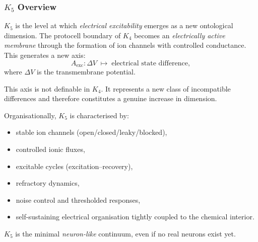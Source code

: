 

\subsubsection{\texorpdfstring{$K_5$}{K_5} Overview}
\label{sec:k5-overview}

$K_5$ is the level at which \emph{electrical excitability} emerges as a
new ontological dimension. The protocell boundary of $K_4$ becomes an
\emph{electrically active membrane} through the formation of ion channels
with controlled conductance. This generates a new axis:
\[
A_{\mathrm{exc}}: \Delta V \;\mapsto\; \text{electrical state difference},
\]
where $\Delta V$ is the transmembrane potential.

This axis is not definable in $K_4$. It represents a new class of
incompatible differences and therefore constitutes a genuine increase in
dimension.

Organisationally, $K_5$ is characterised by:
\begin{itemize}
    \item stable ion channels (open/closed/leaky/blocked),
    \item controlled ionic fluxes,
    \item excitable cycles (excitation–recovery),
    \item refractory dynamics,
    \item noise control and thresholded responses,
    \item self-sustaining electrical organisation tightly coupled to the
          chemical interior.
\end{itemize}

$K_5$ is the minimal \emph{neuron-like} continuum, even if no real
neurons exist yet.

